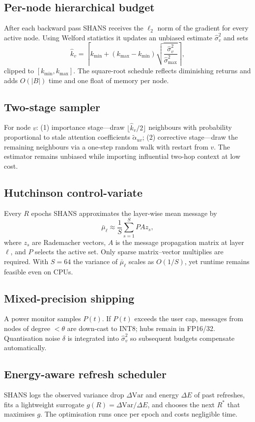 \documentclass{article}
\begin{document}
\subsection{Per-node hierarchical budget}
After each backward pass SHANS receives the \(\ell_2\) norm of the gradient for every active node. Using Welford statistics it updates an unbiased estimate \(\hat{\sigma}_v^2\) and sets
\[\hat{k}_v = \left\lceil k_{\min} + (k_{\max}-k_{\min})\sqrt{\frac{\hat{\sigma}_v^2}{\hat{\sigma}_{\max}^2}}\right\rceil,\]
clipped to \([k_{\min},k_{\max}]\). The square-root schedule reflects diminishing returns and adds \(O(|B|)\) time and one float of memory per node.
\subsection{Two-stage sampler}
For node \(v\): (1) importance stage—draw \(\lfloor\hat{k}_v/2\rfloor\) neighbours with probability proportional to stale attention coefficients \(\tilde{\alpha}_{uv}\); (2) corrective stage—draw the remaining neighbours via a one-step random walk with restart from \(v\). The estimator remains unbiased while importing influential two-hop context at low cost.
\subsection{Hutchinson control-variate}
Every \(R\) epochs SHANS approximates the layer-wise mean message by
\[\bar{\mu}_\ell \approx \frac{1}{S}\sum_{s=1}^{S} P A z_s,\]
where \(z_s\) are Rademacher vectors, \(A\) is the message propagation matrix at layer \(\ell\), and \(P\) selects the active set. Only sparse matrix–vector multiplies are required. With \(S=64\) the variance of \(\bar{\mu}_\ell\) scales as \(O(1/S)\), yet runtime remains feasible even on CPUs.
\subsection{Mixed-precision shipping}
A power monitor samples \(P(t)\). If \(P(t)\) exceeds the user cap, messages from nodes of degree \(<\theta\) are down-cast to INT8; hubs remain in FP16/32. Quantisation noise \(\delta\) is integrated into \(\hat{\sigma}_v^2\) so subsequent budgets compensate automatically.
\subsection{Energy-aware refresh scheduler}
SHANS logs the observed variance drop \(\Delta\mathrm{Var}\) and energy \(\Delta E\) of past refreshes, fits a lightweight surrogate \(g(R)=\Delta\mathrm{Var}/\Delta E\), and chooses the next \(R^*\) that maximises \(g\). The optimisation runs once per epoch and costs negligible time.
\end{document}

